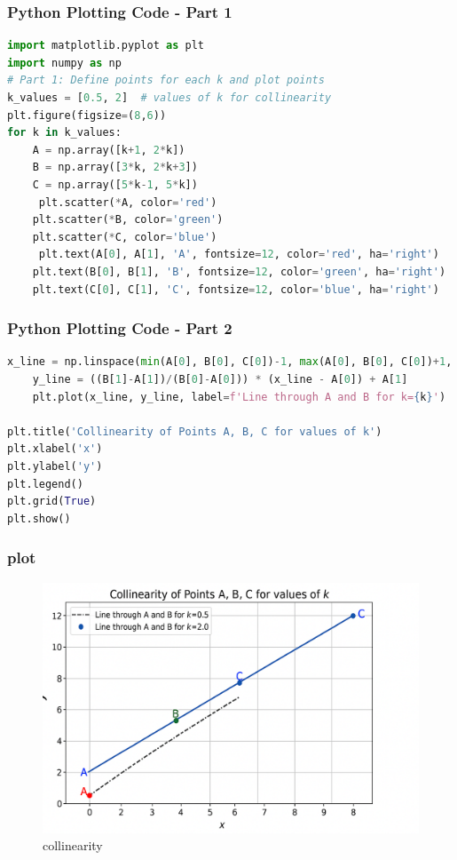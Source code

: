 \documentclass{beamer}
\begin{document}
\begin{frame}[fragile]

\frametitle{\textbf{Python Plotting Code - Part 1}}
\begin{lstlisting}[language=Python]
import matplotlib.pyplot as plt
import numpy as np
# Part 1: Define points for each k and plot points
k_values = [0.5, 2]  # values of k for collinearity
plt.figure(figsize=(8,6))
for k in k_values:
    A = np.array([k+1, 2*k])
    B = np.array([3*k, 2*k+3])
    C = np.array([5*k-1, 5*k])
     plt.scatter(*A, color='red')
    plt.scatter(*B, color='green')
    plt.scatter(*C, color='blue')
     plt.text(A[0], A[1], 'A', fontsize=12, color='red', ha='right')
    plt.text(B[0], B[1], 'B', fontsize=12, color='green', ha='right')
    plt.text(C[0], C[1], 'C', fontsize=12, color='blue', ha='right')
\end{lstlisting}
\end{frame}
\begin{frame}[fragile]

\frametitle{\textbf{Python Plotting Code - Part 2}}
\begin{lstlisting}[language=Python]
    x_line = np.linspace(min(A[0], B[0], C[0])-1, max(A[0], B[0], C[0])+1, 100)
    y_line = ((B[1]-A[1])/(B[0]-A[0])) * (x_line - A[0]) + A[1]
    plt.plot(x_line, y_line, label=f'Line through A and B for k={k}')

plt.title('Collinearity of Points A, B, C for values of k')
plt.xlabel('x')
plt.ylabel('y')
plt.legend()
plt.grid(True)
plt.show()


\end{lstlisting}
\end{frame}
\begin{frame}[fragile]
\frametitle{plot}
\begin{figure}
    \centering
    \includegraphics[width=0.5\linewidth]{beamer//figs/plot.png}
    \caption{collinearity}
    \label{fig:placeholder}
\end{figure}

\end{frame}
\end{document}
